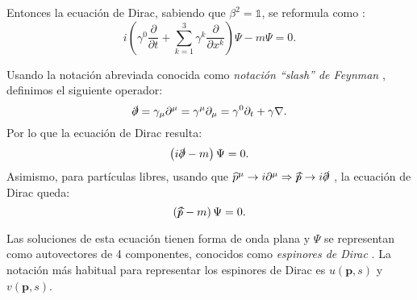 Entonces la ecuación de Dirac, sabiendo que $\beta^2=\mathbb{1}$, se reformula como \cite{MCR}:
\begin{equation}
i\left( \gamma ^{0}\dfrac{\partial }{\partial t}+\sum ^{3}_{k=1}\gamma ^{k}\dfrac{\partial }{\partial x^{k}}\right) \Psi -m\Psi =0 .\label{eq:ecDirac_cov}
\end{equation}

Usando la notación abreviada conocida como \textit{notación ``slash'' de Feynman} \cite{MCR}, definimos el siguiente operador:
\begin{equation}
\slashed{\partial}=\gamma_{\mu }\partial ^{\mu }=\gamma ^{\mu }\partial _{\mu }=\gamma ^{0}\partial _{t}+\gamma \nabla .\label{eq:slashnot}
\end{equation}
Por lo que la ecuación de Dirac resulta:
\begin{equation}
\left(i \slashed{\partial}-m\right) \Psi =0 .\label{eq:Dirac_final}
\end{equation}
Asimismo, para partículas libres, usando que $\widehat{p}^{\mu} \rightarrow i\partial^{\mu} \Rightarrow \slashed{\widehat{p}} \rightarrow i\slashed{\partial}$ \cite{MCR}, la ecuación de Dirac queda:
\begin{equation}
\left( \slashed{\widehat{p}}-m\right) \Psi =0 .\label{eq:Dirac_free}
\end{equation}

Las soluciones de esta ecuación tienen forma de onda plana y $\Psi$ se representan como autovectores de 4 componentes, conocidos como \textit{espinores de Dirac} \cite{MCR}. La notación más habitual para representar los espinores de Dirac es $u(\boldsymbol{p},s)$ y $v(\boldsymbol{p},s)$.

